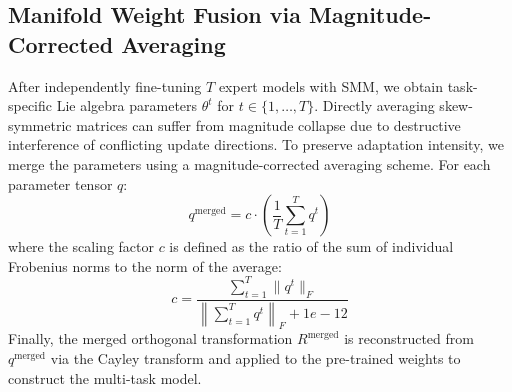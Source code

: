 \documentclass{article}
\theoremstyle{plain}
\theoremstyle{definition}
\theoremstyle{remark}
\begin{document}
\subsection{Manifold Weight Fusion via Magnitude-Corrected Averaging}
After independently fine-tuning $T$ expert models with SMM, we obtain task-specific Lie algebra parameters $\theta^t$ for $t \in \{1, \dots, T\}$. Directly averaging skew-symmetric matrices can suffer from magnitude collapse due to destructive interference of conflicting update directions. To preserve adaptation intensity, we merge the parameters using a magnitude-corrected averaging scheme. For each parameter tensor $q$:
\begin{equation}
    q^{\text{merged}} = c \cdot \left(\frac{1}{T} \sum_{t=1}^T q^t\right)
\end{equation}
where the scaling factor $c$ is defined as the ratio of the sum of individual Frobenius norms to the norm of the average:
\begin{equation}
    c = \frac{\sum_{t=1}^T \|q^t\|_F}{\left\| \sum_{t=1}^T q^t \right\|_F + 1e-12}
\end{equation}
Finally, the merged orthogonal transformation $R^{\text{merged}}$ is reconstructed from $q^{\text{merged}}$ via the Cayley transform and applied to the pre-trained weights to construct the multi-task model.
\end{document}
